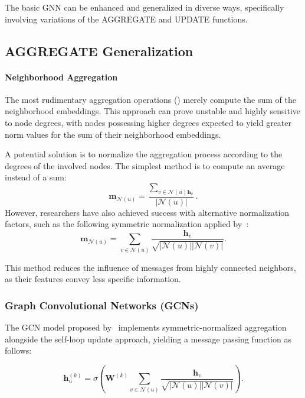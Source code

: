 The basic GNN can be enhanced and generalized in diverse ways, specifically involving variations of the AGGREGATE and UPDATE functions.

\subsection{AGGREGATE Generalization}
\paragraph{Neighborhood Aggregation}
The most rudimentary aggregation operations () merely compute the sum of the neighborhood embeddings. This approach can prove unstable and highly sensitive to node degrees, with nodes possessing higher degrees expected to yield greater norm values for the sum of their neighborhood embeddings.

A potential solution is to normalize the aggregation process according to the degrees of the involved nodes. The simplest method is to compute an average instead of a sum:
\begin{equation*}
    \mathbf{m}_{\mathcal{N}(u)} = \frac{\sum_{v \in \mathcal{N}(u) \mathbf{h}_v}}{|\mathcal{N}(u)|}.
\end{equation*}
However, researchers have also achieved success with alternative normalization factors, such as the following symmetric normalization applied by~\cite{kipf2016semi}:
\begin{equation*}
    \mathbf{m}_{\mathcal{N}(u)} = \sum_{v \in \mathcal{N}(u)}\frac{ \mathbf{h}_v}{\sqrt{|\mathcal{N}(u)||\mathcal{N}(v)|}}.
\end{equation*}

This method reduces the influence of messages from highly connected neighbors, as their features convey less specific information.

\subsubsection{Graph Convolutional Networks (GCNs)}
The GCN model proposed by~\cite{kipf2016semi} implements symmetric-normalized aggregation alongside the self-loop update approach, yielding a message passing function as follows:

\begin{equation*}
    \mathbf{h}_u^{(k)} = \sigma\left(\mathbf{W}^{(k)}\sum_{v \in \mathcal{N}(u)}\frac{ \mathbf{h}_v}{\sqrt{|\mathcal{N}(u)||\mathcal{N}(v)|}}\right).
\end{equation*}

